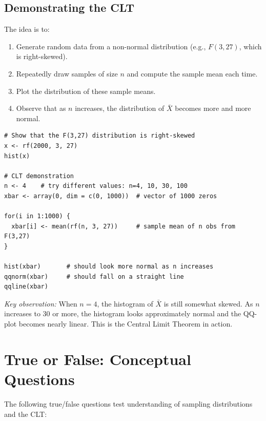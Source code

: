 \documentclass[10pt]{report}
\begin{document}
\subsection{Demonstrating the CLT}

The idea is to:
\begin{enumerate}
  \item Generate random data from a non-normal distribution (e.g., $F(3, 27)$, which is right-skewed).
  \item Repeatedly draw samples of size $n$ and compute the sample mean each time.
  \item Plot the distribution of these sample means.
  \item Observe that as $n$ increases, the distribution of $\bar{X}$ becomes more and more normal.
\end{enumerate}

\begin{lstlisting}
# Show that the F(3,27) distribution is right-skewed
x <- rf(2000, 3, 27)
hist(x)

# CLT demonstration
n <- 4    # try different values: n=4, 10, 30, 100
xbar <- array(0, dim = c(0, 1000))  # vector of 1000 zeros

for(i in 1:1000) {
  xbar[i] <- mean(rf(n, 3, 27))     # sample mean of n obs from F(3,27)
}

hist(xbar)       # should look more normal as n increases
qqnorm(xbar)     # should fall on a straight line
qqline(xbar)
\end{lstlisting}

\textit{Key observation:} When $n = 4$, the histogram of $\bar{X}$ is still somewhat skewed. As $n$ increases to 30 or more, the histogram looks approximately normal and the QQ-plot becomes nearly linear. This is the Central Limit Theorem in action.

\section{True or False: Conceptual Questions}

The following true/false questions test understanding of sampling distributions and the CLT:
\end{document}
